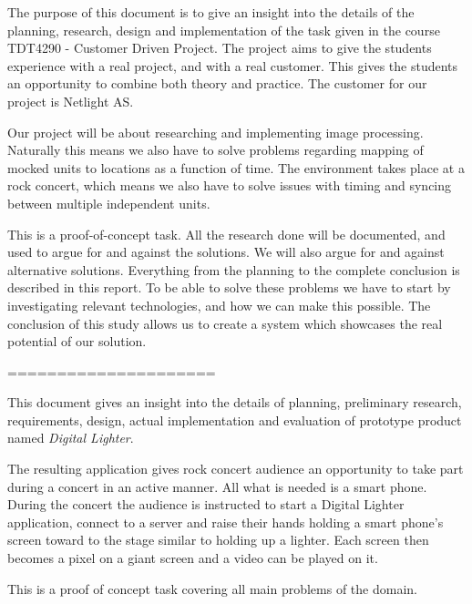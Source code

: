 The purpose of this document is to give an insight into the details of the planning, research, design and implementation of the task given in the course TDT4290 - Customer Driven Project. 
The project aims to give the students experience with a real project, and with a real customer. 
This gives the students an opportunity to combine both theory and practice. 
The customer for our project is Netlight AS.  

Our project will be about researching and implementing image processing. 
Naturally this means we also have to solve problems regarding mapping of mocked units to locations as a function of time. 
The environment takes place at a rock concert, which means we also have to solve issues with timing and syncing between multiple independent units.

This is a proof-of-concept task.  
All the research done will be documented, and used to argue for and against the solutions. 
We will also argue for and against alternative solutions. Everything from the planning to the complete conclusion is described in this report. 
To be able to solve these problems we have to start by investigating relevant technologies, and how we can make this possible.
The conclusion of this study allows us to create a system which showcases the real potential of our solution.

=====================

This document gives an insight into the details of planning, preliminary research, requirements, design, actual implementation and evaluation of prototype product named \emph{Digital Lighter}.

The resulting application gives rock concert audience an opportunity to take part during a concert in an active manner. 
All what is needed is a smart phone.
During the concert the audience is instructed to start a Digital Lighter application, connect to a server and raise their hands holding a smart phone's screen toward to the stage similar to holding up a lighter. 
Each screen then becomes a pixel on a giant screen and a video can be played on it.

This is a proof of concept task covering all main problems of the domain.



